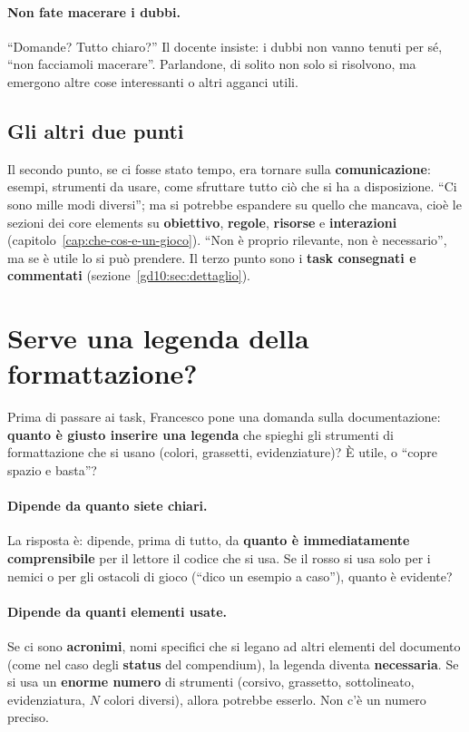 \paragraph{Non fate macerare i dubbi.} ``Domande? Tutto chiaro?'' Il
docente insiste: i dubbi non vanno tenuti per sé, ``non facciamoli
macerare''. Parlandone, di solito non solo si risolvono, ma emergono altre
cose interessanti o altri agganci utili.

\subsection{Gli altri due punti}

Il secondo punto, se ci fosse stato tempo, era tornare sulla
\textbf{comunicazione}: esempi, strumenti da usare, come sfruttare tutto ciò
che si ha a disposizione. ``Ci sono mille modi diversi''; ma si potrebbe
espandere su quello che mancava, cioè le sezioni dei core elements su
\textbf{obiettivo}, \textbf{regole}, \textbf{risorse} e
\textbf{interazioni} (capitolo~\ref{cap:che-cos-e-un-gioco}). ``Non è
proprio rilevante, non è necessario'', ma se è utile lo si può prendere. Il
terzo punto sono i \textbf{task consegnati e commentati}
(sezione~\ref{gd10:sec:dettaglio}).

\section{Serve una legenda della formattazione?}
\label{gd10:sec:legenda}

Prima di passare ai task, Francesco pone una domanda sulla documentazione:
\textbf{quanto è giusto inserire una legenda} che spieghi gli strumenti di
formattazione che si usano (colori, grassetti, evidenziature)? È utile,
o ``copre spazio e basta''?

\paragraph{Dipende da quanto siete chiari.} La risposta è: dipende, prima di
tutto, da \textbf{quanto è immediatamente comprensibile} per il lettore il
codice che si usa. Se il rosso si usa solo per i nemici o per gli ostacoli
di gioco (``dico un esempio a caso''), quanto è evidente?

\paragraph{Dipende da quanti elementi usate.} Se ci sono \textbf{acronimi},
nomi specifici che si legano ad altri elementi del documento (come nel caso
degli \textbf{status} del compendium), la legenda diventa
\textbf{necessaria}. Se si usa un \textbf{enorme numero} di strumenti
(corsivo, grassetto, sottolineato, evidenziatura, $N$ colori diversi), allora
potrebbe esserlo. Non c'è un numero preciso.

